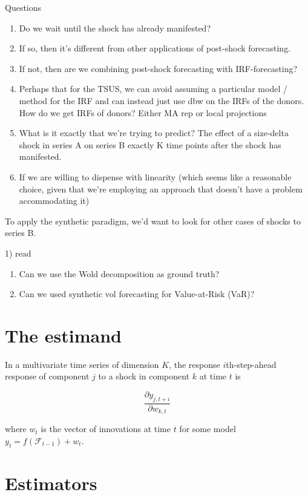 \documentclass[11pt]{article}
\theoremstyle{definition}
\begin{document}
Questions
\begin{enumerate}
  \item Do we wait until the shock has already manifested?
  \item If so, then it's different from other applications of post-shock forecasting.
  \item If not, then are we combining post-shock forecasting with IRF-forecasting?
  \item Perhaps that for the TSUS, we can avoid assuming a particular model / method for the IRF and can instead just use dbw on the IRFs of the donors. How do we get IRFs of donors? Either MA rep or local projections
  \item What is it exactly that we're trying to predict?  The effect of a size-delta shock in series A on series B exactly K time points after the shock has manifested.
  \item If we are willing to dispense with linearity (which seems like a reasonable choice, given that we're employing an approach that doesn't have a problem accommodating it)

\end{enumerate}

To apply the synthetic paradigm, we'd want to look for other cases of shocks to series B.

1) read  \citet{ho2023averaging}

\begin{enumerate}
    \item Can we use the Wold decomposition as ground truth?
    \item Can we used synthetic vol forecasting for Value-at-Risk (VaR)?
\end{enumerate}

\section{The estimand}

In a multivariate time series of dimension $K$, the response $i$th-step-ahead response of component $j$ to a shock in component $k$ at time $t$ is

\[
   \frac{\partial y_{j,t+i}}{\partial w_{k,t}}
\]

where $w_{t}$ is the vector of innovations at time $t$ for some model $y_{t} = f(\mathcal{F}_{t-1}) + w_{t}$.

\section{Estimators}
\end{document}

